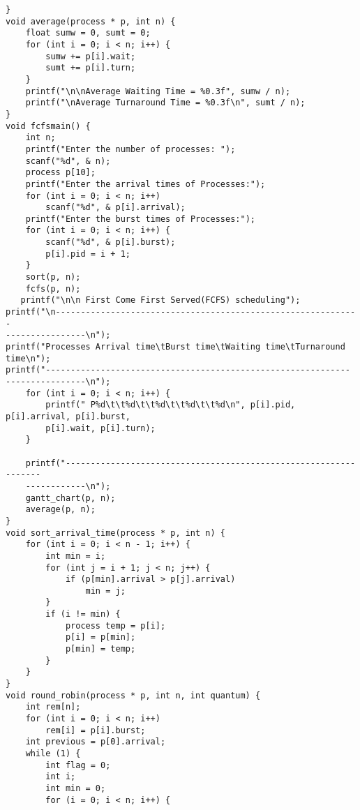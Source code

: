 \documentclass{article}
\begin{document}
\begin{Verbatim}[tabsize = 4]
}
void average(process * p, int n) {
    float sumw = 0, sumt = 0;
    for (int i = 0; i < n; i++) {
        sumw += p[i].wait;
        sumt += p[i].turn;
    }
    printf("\n\nAverage Waiting Time = %0.3f", sumw / n);
    printf("\nAverage Turnaround Time = %0.3f\n", sumt / n);
}
void fcfsmain() {
    int n;
    printf("Enter the number of processes: ");
    scanf("%d", & n);
    process p[10];
    printf("Enter the arrival times of Processes:");
    for (int i = 0; i < n; i++)
        scanf("%d", & p[i].arrival);
    printf("Enter the burst times of Processes:");
    for (int i = 0; i < n; i++) {
        scanf("%d", & p[i].burst);
        p[i].pid = i + 1;
    }
    sort(p, n);
    fcfs(p, n);
   printf("\n\n First Come First Served(FCFS) scheduling");
printf("\n-------------------------------------------------------------
----------------\n");
printf("Processes Arrival time\tBurst time\tWaiting time\tTurnaround time\n");
printf("-------------------------------------------------------------
----------------\n");
    for (int i = 0; i < n; i++) {
        printf(" P%d\t\t%d\t\t%d\t\t%d\t\t%d\n", p[i].pid, p[i].arrival, p[i].burst,
        p[i].wait, p[i].turn);
    }

    printf("-----------------------------------------------------------------
    ------------\n");
    gantt_chart(p, n);
    average(p, n);
}
void sort_arrival_time(process * p, int n) {
    for (int i = 0; i < n - 1; i++) {
        int min = i;
        for (int j = i + 1; j < n; j++) {
            if (p[min].arrival > p[j].arrival)
                min = j;
        }
        if (i != min) {
            process temp = p[i];
            p[i] = p[min];
            p[min] = temp;
        }
    }
}
void round_robin(process * p, int n, int quantum) {
    int rem[n];
    for (int i = 0; i < n; i++)
        rem[i] = p[i].burst;
    int previous = p[0].arrival;
    while (1) {
        int flag = 0;
        int i;
        int min = 0;
        for (i = 0; i < n; i++) {


\end{Verbatim}
\end{document}
